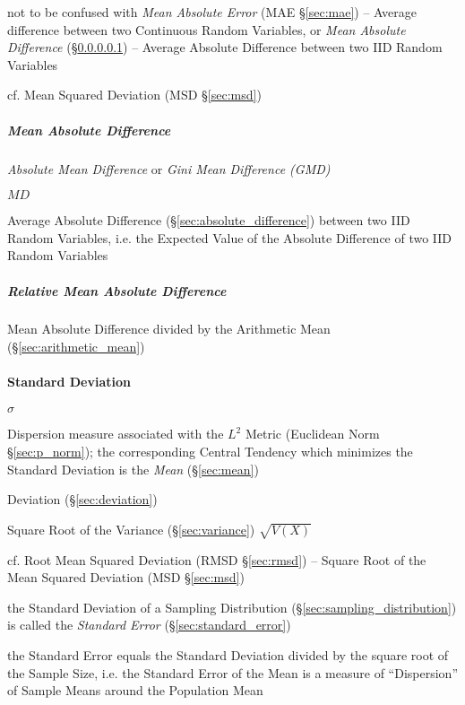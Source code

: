 \fist not to be confused with \emph{Mean Absolute Error} (MAE \S\ref{sec:mae})
-- Average difference between two Continuous Random Variables,
or \emph{Mean Absolute Difference} (\S\ref{sec:mean_absolute_difference}) --
Average Absolute Difference between two IID Random Variables

cf. Mean Squared Deviation (MSD \S\ref{sec:msd})



\subparagraph{Mean Absolute Difference}
\label{sec:mean_absolute_difference}\hfill

\emph{Absolute Mean Difference} or \emph{Gini Mean Difference (GMD)}

$MD$

Average Absolute Difference (\S\ref{sec:absolute_difference}) between two IID
Random Variables, i.e. the Expected Value of the Absolute Difference of two IID
Random Variables



\subparagraph{Relative Mean Absolute Difference}
\label{sec:relative_mean_absolute_difference}\hfill

Mean Absolute Difference divided by the Arithmetic Mean
(\S\ref{sec:arithmetic_mean})



\paragraph{Standard Deviation}\label{sec:standard_deviation}\hfill

$\sigma$

Dispersion measure associated with the $L^2$ Metric (Euclidean Norm
\S\ref{sec:p_norm}); the corresponding Central Tendency which minimizes the
Standard Deviation is the \emph{Mean} (\S\ref{sec:mean})

Deviation (\S\ref{sec:deviation})

Square Root of the Variance (\S\ref{sec:variance}) $\sqrt{V(X)}$

cf. Root Mean Squared Deviation (RMSD \S\ref{sec:rmsd}) -- Square Root of the
Mean Squared Deviation (MSD \S\ref{sec:msd})

the Standard Deviation of a Sampling Distribution
(\S\ref{sec:sampling_distribution}) is called the \emph{Standard Error}
(\S\ref{sec:standard_error})

the Standard Error equals the Standard Deviation divided by the square root of
the Sample Size, i.e. the Standard Error of the Mean is a measure of
``Dispersion'' of Sample Means around the Population Mean

